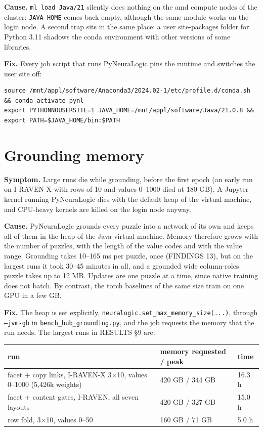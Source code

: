 \textbf{Cause.} \texttt{ml load Java/21} silently does nothing on the amd compute nodes of the cluster: \texttt{JAVA\_HOME} comes back empty, although the same module works on the login node. A second trap sits in the same place: a user site-packages folder for Python 3.11 shadows the conda environment with other versions of some libraries.

\textbf{Fix.} Every job script that runs PyNeuraLogic pins the runtime and switches the user site off:

\begin{Verbatim}[fontsize=\small,breaklines]
source /mnt/appl/software/Anaconda3/2024.02-1/etc/profile.d/conda.sh && conda activate pynl
export PYTHONNOUSERSITE=1 JAVA_HOME=/mnt/appl/software/Java/21.0.8 && export PATH=$JAVA_HOME/bin:$PATH
\end{Verbatim}

\section{Grounding memory}\label{sec:A.5}

\textbf{Symptom.} Large runs die while grounding, before the first epoch (an early run on I-RAVEN-X with rows of 10 and values 0–1000 died at 180 GB). A Jupyter kernel running PyNeuraLogic dies with the default heap of the virtual machine, and CPU-heavy kernels are killed on the login node anyway.

\textbf{Cause.} PyNeuraLogic grounds every puzzle into a network of its own and keeps all of them in the heap of the Java virtual machine. Memory therefore grows with the number of puzzles, with the length of the value codes and with the value range. Grounding takes 10–165 ms per puzzle, once (FINDINGS 13), but on the largest runs it took 30–45 minutes in all, and a grounded wide column-roles puzzle takes up to 12 MB. Updates are one puzzle at a time, since native training does not batch. By contrast, the torch baselines of the same size train on one GPU in a few GB.

\textbf{Fix.} The heap is set explicitly, \texttt{neuralogic.set\_max\_memory\_size(...)}, through \texttt{--jvm-gb} in \texttt{bench\_hub\_grounding.py}, and the job requests the memory that the run needs. The largest runs in RESULTS \S{}9 are:

\begin{center}\small
\begin{tabularx}{\linewidth}{@{}YYl@{}}
\toprule
run & memory requested / peak & time \\
\midrule
facet + copy links, I-RAVEN-X 3×10, values 0–1000 (5,426k weights) & 420 GB / 344 GB & 16.3 h \\
facet + content gates, I-RAVEN, all seven layouts & 420 GB / 327 GB & 15.0 h \\
row fold, 3×10, values 0–50 & 160 GB / 71 GB & 5.0 h \\
\bottomrule
\end{tabularx}
\end{center}

